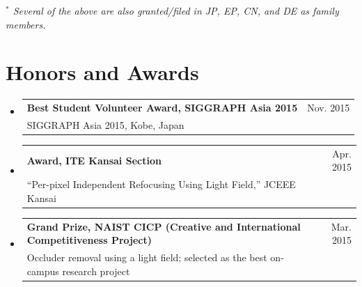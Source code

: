 \documentclass[a4paper,11pt]{article}
\makeatletter
\newcommand{\CVSubheading}[4]{
  \vspace{-2pt}\item
    \begin{tabular*}{0.97\textwidth}[t]{l@{\extracolsep{\fill}}r}
      \textbf{#1} & #2 \\
      \small#3 & \small #4 \\
    \end{tabular*}\vspace{-7pt}
}
\newcommand{\CVSubHeadingListStart}{\begin{itemize}[leftmargin=0.5cm, label={}]}
\newcommand{\CVSubHeadingListEnd}{\end{itemize}}
\makeatother
\begin{document}
 \vspace{-4pt}
 {\small \hspace{0.6cm}\emph{$^{*}$ Several of the above are also granted/filed in JP, EP, CN, and DE as family members.}}

\section{Honors and Awards}
  \CVSubHeadingListStart
    \CVSubheading
      {Best Student Volunteer Award, SIGGRAPH Asia 2015}{Nov. 2015}
      {SIGGRAPH Asia 2015, Kobe, Japan}{}
    \CVSubheading
      {Award, ITE Kansai Section}{Apr. 2015}
      {``Per-pixel Independent Refocusing Using Light Field,'' JCEEE Kansai}{}
    \CVSubheading
      {Grand Prize, NAIST CICP (Creative and International Competitiveness Project)}{Mar. 2015}
      {Occluder removal using a light field; selected as the best on-campus research project}{}
  \CVSubHeadingListEnd

\end{document}
